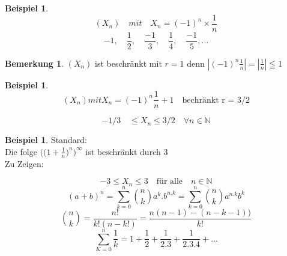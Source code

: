 \documentclass[a4paper,12pt,leqno]{report}
\theoremstyle{plain} %
\theoremstyle{definition} %
\newtheorem{remark}[theorem]{Bemerkung}
\newtheorem{example}[theorem]{Beispiel}
\begin{document}
\begin{example}
\[(X_n)\quad mit \quad X_n = (-1)^n \times \frac{1}{n} \]
\[-1 ,\quad \frac{1}{2}, \quad \frac{-1}{3}, \quad \frac{1}{4} ,\quad \frac{-1}{5},\dots \]
\end{example}

\begin{remark}

$(X_n)$ ist beschränkt mit $r = 1$ denn $|(-1)^n \frac{1}{n}|=|\frac{1}{n}| \leqq 1  $  

\end{remark}

\begin{example}
	\[  (X_n) mit X_n = (-1)^n \frac{1}{n}+1 \quad \text{bechränkt r = 3/2}\]
	
	\[-1/3 \quad \leq X_n \leq 3/2 \quad \forall n \in \mathbb{N} \]
\end{example}
\vfil
\vfil
\begin{example}{Standard:}\\

{Die folge}
$ \bigg(\big(1 + \frac{1}{n} \big)^n \bigg)^\infty$	
	 {ist beschränkt durch 3}\\
	 
Zu Zeigen:
	
\[ -3 \leq X_n \leq 3 \quad \text{für alle} \quad n \in \mathbb{N} \]
\[ { (a+b)^n = \sum_{k=0}^{n} \binom{n}{k} a^k . b^{n .k} = \sum_{k=0}^{n} \binom{n}{k} a^{n.k} b^k }  \]  
	\[  \binom{n}{k} = \frac{n!}{k!(n-k!)} =  \frac{n(n-1) -(n-k-1))}{k!} \]
	\[  \sum_{K=0}^{n} \frac{1}{k} = 1+ \frac{1}{2} + \frac{1}{2.3} + \frac{1}{2.3.4} + \dots \]
\end{example}
\end{document}

